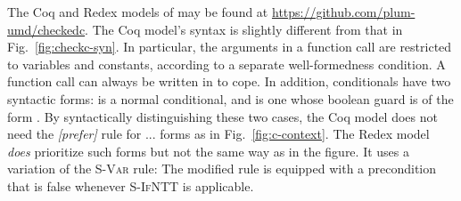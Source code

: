 The Coq and Redex models of \lang may be found at \url{https://github.com/plum-umd/checkedc}.
The Coq model's syntax is slightly different from that in
Fig.~\ref{fig:checkc-syn}. In particular, the arguments in a function call
are restricted to variables and constants, according to
a separate well-formedness condition. A function call  can
always be written in  to cope.
In addition,
conditionals have two syntactic forms:  is a normal
conditional, and  is one whose boolean guard is of the
form . By syntactically distinguishing these two
cases, the Coq model does not need the \emph{[prefer]} rule for
$...$ forms as in
Fig.~\ref{fig:c-context}. The Redex model \emph{does} prioritize such
forms but not the same way as in the figure. It uses a variation of
the \textsc{S-Var} rule: The 
modified rule is equipped with a precondition that is false whenever
\textsc{S-IfNTT} is applicable.

